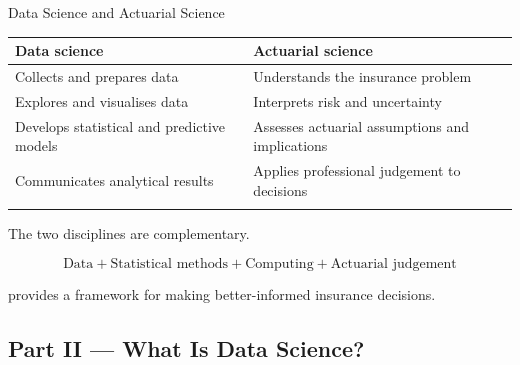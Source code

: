\documentclass[
  ignorenonframetext,
  aspectratio=169,
]{beamer}
\newcounter{none} %
\begin{document}
\begin{frame}{Data Science and Actuarial Science}
\protect{}\label{data-science-and-actuarial-science}
{\def\LTcaptype{none} %
\begin{longtable}[]{@{}
  >{\raggedright\arraybackslash}p{}
  >{\raggedright\arraybackslash}p{}@{}}
\toprule\noalign{}
\begin{minipage}[b]{\linewidth}\raggedright
Data science
\end{minipage} & \begin{minipage}[b]{\linewidth}\raggedright
Actuarial science
\end{minipage} \\
\midrule\noalign{}
\endhead
Collects and prepares data & Understands the insurance problem \\
Explores and visualises data & Interprets risk and uncertainty \\
Develops statistical and predictive models & Assesses actuarial
assumptions and implications \\
Communicates analytical results & Applies professional judgement to
decisions \\
\bottomrule\noalign{}
\end{longtable}
}

The two disciplines are complementary.

\[
\boxed{
\text{Data}
+
\text{Statistical methods}
+
\text{Computing}
+
\text{Actuarial judgement}
}
\]

provides a framework for making better-informed insurance decisions.
\end{frame}

\subsection{Part II --- What Is Data
Science?}\label{part-ii-what-is-data-science}
\end{document}
